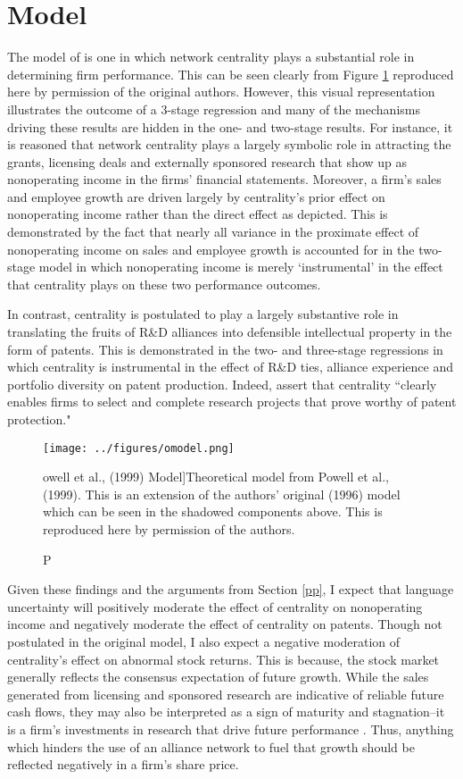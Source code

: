 \section{Model}
The model of \citet{powell1999} is one in which network centrality plays a substantial role in determining firm performance. This can be seen clearly from Figure \ref{omodel} reproduced here by permission of the original authors. However, this visual representation illustrates the outcome of a 3-stage regression and many of the mechanisms driving these results are hidden in the one- and two-stage results.  For instance, it is reasoned that network centrality plays a largely symbolic role in attracting the grants, licensing deals and externally sponsored research that show up as nonoperating income in the firms' financial statements. Moreover, a firm's sales and employee growth are driven largely by centrality's prior effect on nonoperating income rather than the direct effect as depicted. This is demonstrated by the fact that nearly all variance in the proximate effect of nonoperating income on sales and employee growth is accounted for in the two-stage model in which nonoperating income is merely `instrumental' in the effect that centrality plays on these two performance outcomes.

In contrast, centrality is postulated to play a largely substantive role in translating the fruits of R\&D alliances into defensible intellectual property in the form of patents. This is demonstrated in the two- and three-stage regressions in which centrality is instrumental in the effect of R\&D ties, alliance experience and portfolio diversity on patent production. Indeed, \citet[p. 20]{powell1999} assert that centrality ``clearly enables firms to select and complete research projects that prove worthy of patent protection."

\begin{figure}
\begin{center}
\texttt{[image: ../figures/omodel.png]}
\caption Powell et al., (1999) Model]{Theoretical model from Powell et al., (1999). This is an extension of the authors' original (1996) model which can be seen in the shadowed components above. This is reproduced here by permission of the authors.\label{omodel}}
\end{center}
\end{figure}

Given these findings and the arguments from Section \ref{pp}, I expect that language uncertainty will positively moderate the effect of centrality on nonoperating income and negatively moderate the effect of centrality on patents. Though not postulated in the original model, I also expect a negative moderation of centrality's effect on abnormal stock returns. This is because, the stock market generally reflects the consensus expectation of future growth. While the sales generated from licensing and sponsored research are indicative of reliable future cash flows, they may also be interpreted as a sign of maturity and stagnation--it is a firm's investments in research that drive future performance \citep{wolff2001}. Thus, anything which hinders the use of an alliance network to fuel that growth should be reflected negatively in a firm's share price. 


